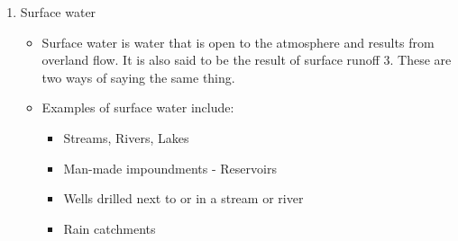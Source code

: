 \begin{enumerate}
\item Surface water\\
\begin{itemize}
\item Surface water is water that is open to the atmosphere and results from overland flow. It is also said to be the result of surface runoff 3. These are two ways of saying the same thing.
\item Examples of surface water include:
\begin{itemize}
\item Streams, Rivers, Lakes
\item Man-made impoundments - Reservoirs
\item Wells drilled next to or in a stream or river
\item Rain catchments
\end{itemize}


\end{itemize}
\end{enumerate}

